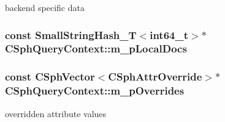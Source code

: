 backend specific data 

\hypertarget{classCSphQueryContext_a1a64d73d4c94e6efe7460dbb0881bd2e}{
\subsubsection[{m\-\_\-p\-Local\-Docs}]{\setlength{\rightskip}{0pt plus 5cm}const {\bf Small\-String\-Hash\-\_\-\-T}$<${\bf int64\-\_\-t}$>$$\ast$ C\-Sph\-Query\-Context\-::m\-\_\-p\-Local\-Docs}}\label{classCSphQueryContext_a1a64d73d4c94e6efe7460dbb0881bd2e}
\hypertarget{classCSphQueryContext_a5017f23729432ca54f9530a6555f46f3}{
\subsubsection[{m\-\_\-p\-Overrides}]{\setlength{\rightskip}{0pt plus 5cm}const {\bf C\-Sph\-Vector}$<${\bf C\-Sph\-Attr\-Override}$>$$\ast$ C\-Sph\-Query\-Context\-::m\-\_\-p\-Overrides}}\label{classCSphQueryContext_a5017f23729432ca54f9530a6555f46f3}


overridden attribute values 

